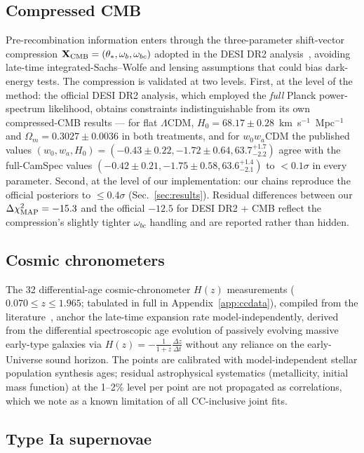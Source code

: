 \documentclass[aps,prd,preprint,superscriptaddress,nofootinbib]{revtex4-2}
\begin{document}
\subsection{Compressed CMB}

Pre-recombination information enters through the three-parameter shift-vector compression $\mathbf{X}_{\rm CMB} = (\theta_*, \omega_b, \omega_{bc})$ adopted in the DESI DR2 analysis~\cite{DESI2025}, avoiding late-time integrated-Sachs--Wolfe and lensing assumptions that could bias dark-energy tests. The compression is validated at two levels. First, at the level of the method: the official DESI DR2 analysis, which employed the \emph{full} Planck power-spectrum likelihood, obtains constraints indistinguishable from its own compressed-CMB results --- for flat $\Lambda$CDM, $H_0 = 68.17 \pm 0.28$~km~s$^{-1}$~Mpc$^{-1}$ and $\Omega_m = 0.3027 \pm 0.0036$ in both treatments, and for $w_0w_a$CDM the published values $(w_0, w_a, H_0) = (-0.43 \pm 0.22, -1.72 \pm 0.64, 63.7^{+1.7}_{-2.2})$ agree with the full-CamSpec values $(-0.42 \pm 0.21, -1.75 \pm 0.58, 63.6^{+1.4}_{-2.1})$ to $<0.1\sigma$ in every parameter. Second, at the level of our implementation: our chains reproduce the official posteriors to $\le 0.4\sigma$ (Sec.~\ref{sec:results}). Residual differences between our $\Delta\chi^2_{\rm MAP} = -15.3$ and the official $-12.5$ for DESI DR2 + CMB reflect the compression's slightly tighter $\omega_{bc}$ handling and are reported rather than hidden.

\subsection{Cosmic chronometers}

The 32 differential-age cosmic-chronometer $H(z)$ measurements ($0.070 \le z \le 1.965$; tabulated in full in Appendix~\ref{app:ccdata}), compiled from the literature~\cite{Carloni2026}, anchor the late-time expansion rate model-independently, derived from the differential spectroscopic age evolution of passively evolving massive early-type galaxies via $H(z) = -\frac{1}{1+z} \frac{\Delta z}{\Delta t}$ without any reliance on the early-Universe sound horizon. The points are calibrated with model-independent stellar population synthesis ages; residual astrophysical systematics (metallicity, initial mass function) at the 1--2\% level per point are not propagated as correlations, which we note as a known limitation of all CC-inclusive joint fits.

\subsection{Type Ia supernovae}
\end{document}
